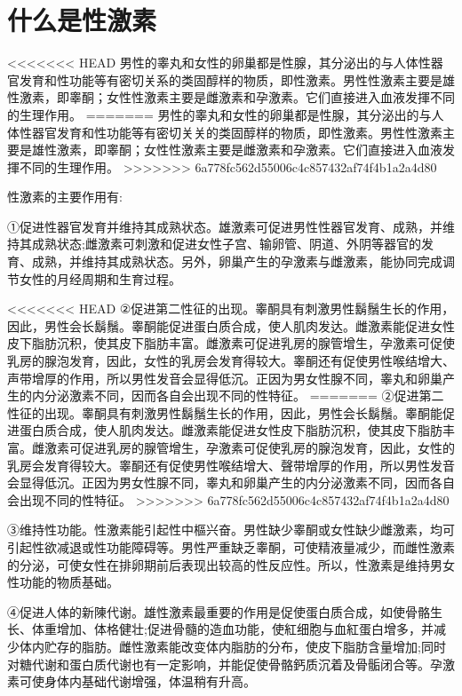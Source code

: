 \documentclass[12pt,UTF8]{ctexbook}
\begin{document}
\section{什么是性激素}

<<<<<<< HEAD
男性的睾丸和女性的卵巢都是性腺，其分泌出的与人体性器官发育和性功能等有密切关系的类固醇样的物质，即性激素。男性性激素主要是雄性激素，即睾酮；女性性激素主要是雌激素和孕激素。它们直接进入血液发揮不同的生理作用。
=======
男性的睾丸和女性的卵巢都是性腺，其分泌出的与人体性器官发育和性功能等有密切关关的类固醇样的物质，即性激素。男性性激素主要是雄性激素，即睾酮；女性性激素主要是雌激素和孕激素。它们直接进入血液发揮不同的生理作用。
>>>>>>> 6a778fc562d55006c4c857432af74f4b1a2a4d80

性激素的主要作用有:

①促进性器官发育并维持其成熟状态。雄激素可促进男性性器官发育、成熟，并维持其成熟状态;雌激素可刺激和促进女性子宫、输卵管、阴道、外阴等器官的发育、成熟，并维持其成熟状态。另外，卵巢产生的孕激素与雌激素，能协同完成调节女性的月经周期和生育过程。

<<<<<<< HEAD
②促进第二性征的出现。睾酮具有刺激男性鬍鬚生长的作用，因此，男性会长鬍鬚。睾酮能促进蛋白质合成，使人肌肉发达。雌激素能促进女性皮下脂肪沉积，使其皮下脂肪丰富。雌激素可促进乳房的腺管增生，孕激素可促使乳房的腺泡发育，因此，女性的乳房会发育得较大。睾酮还有促使男性喉结增大、声带增厚的作用，所以男性发音会显得低沉。正因为男女性腺不同，睾丸和卵巢产生的内分泌激素不同，因而各自会出现不同的性特征。
=======
②促进第二性征的出现。睾酮具有刺激男性鬍鬚生长的作用，因此，男性会长鬍鬚。睾酮能促进蛋白质合成，使人肌肉发达。雌激素能促进女性皮下脂肪沉积，使其皮下脂肪丰富。雌激素可促进乳房的腺管增生，孕激素可促使乳房的腺泡发育，因此，女性的乳房会发育得较大。睾酮还有促使男性喉结增大、聲带增厚的作用，所以男性发音会显得低沉。正因为男女性腺不同，睾丸和卵巢产生的内分泌激素不同，因而各自会出现不同的性特征。
>>>>>>> 6a778fc562d55006c4c857432af74f4b1a2a4d80

③维持性功能。性激素能引起性中樞兴奋。男性缺少睾酮或女性缺少雌激素，均可引起性欲减退或性功能障碍等。男性严重缺乏睾酮，可使精液量减少，而雌性激素的分泌，可使女性在排卵期前后表现出较高的性反应性。所以，性激素是维持男女性功能的物质基础。

④促进人体的新陳代谢。雄性激素最重要的作用是促使蛋白质合成，如使骨骼生长、体重增加、体格健壮;促进骨髓的造血功能，使紅细胞与血紅蛋白增多，并减少体内贮存的脂肪。雌性激素能改变体内脂肪的分布，使皮下脂肪含量增加;同时对糖代谢和蛋白质代谢也有一定影响，并能促使骨骼鈣质沉着及骨骺闭合等。孕激素可使身体内基础代谢增强，体温稍有升高。
\end{document}
